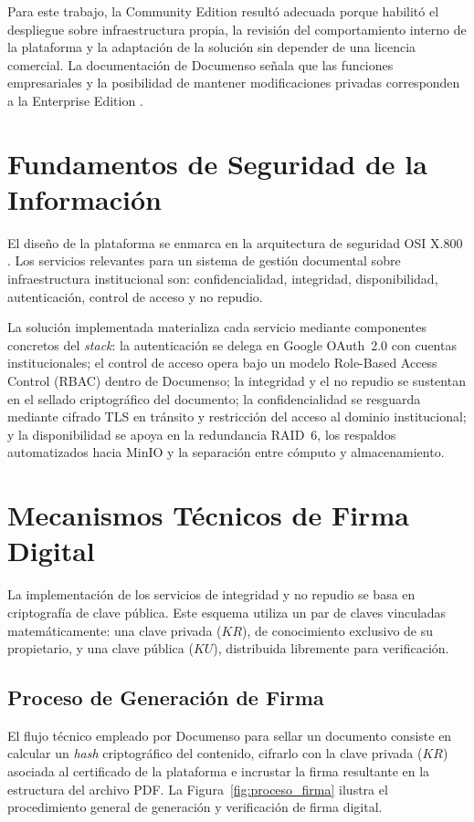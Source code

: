 Para este trabajo, la Community Edition resultó adecuada porque habilitó el despliegue sobre infraestructura propia, la revisión del comportamiento interno de la plataforma y la adaptación de la solución sin depender de una licencia comercial. La documentación de Documenso señala que las funciones empresariales y la posibilidad de mantener modificaciones privadas corresponden a la Enterprise Edition \cite{documenso_community}.

\section{Fundamentos de Seguridad de la Información}
\label{sec:fundamentos_seguridad}

El diseño de la plataforma se enmarca en la arquitectura de seguridad OSI X.800 \cite{saade_redes_2024}. Los servicios relevantes para un sistema de gestión documental sobre infraestructura institucional son: confidencialidad, integridad, disponibilidad, autenticación, control de acceso y no repudio.

La solución implementada materializa cada servicio mediante componentes concretos del \textit{stack}: la autenticación se delega en Google OAuth~2.0 con cuentas institucionales; el control de acceso opera bajo un modelo Role-Based Access Control (RBAC) dentro de Documenso; la integridad y el no repudio se sustentan en el sellado criptográfico del documento; la confidencialidad se resguarda mediante cifrado TLS en tránsito y restricción del acceso al dominio institucional; y la disponibilidad se apoya en la redundancia RAID~6, los respaldos automatizados hacia MinIO y la separación entre cómputo y almacenamiento.

\section{Mecanismos Técnicos de Firma Digital}
\label{sec:mecanismo_tecnico}

La implementación de los servicios de integridad y no repudio se basa en criptografía de clave pública. Este esquema utiliza un par de claves vinculadas matemáticamente: una clave privada ($KR$), de conocimiento exclusivo de su propietario, y una clave pública ($KU$), distribuida libremente para verificación.

\subsection{Proceso de Generación de Firma}
El flujo técnico empleado por Documenso \cite{documenso_docs_signing} para sellar un documento consiste en calcular un \textit{hash} criptográfico del contenido, cifrarlo con la clave privada ($KR$) asociada al certificado de la plataforma e incrustar la firma resultante en la estructura del archivo PDF. La Figura~\ref{fig:proceso_firma} ilustra el procedimiento general de generación y verificación de firma digital.

